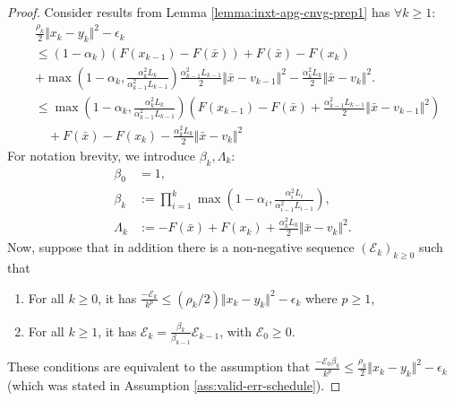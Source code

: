 \documentclass[12pt]{article}
\begin{document}
    \begin{proof}
        Consider results from Lemma \ref{lemma:inxt-apg-cnvg-prep1} has $\forall k \ge 1$: 
        \begin{align*}
            & \frac{\rho_k}{2}\Vert x_k - y_k\Vert^2 - \epsilon_k
            \\
            &\le 
            (1 - \alpha_k)(F(x_{k - 1}) - F(\bar x)) + F(\bar x) - F(x_k) 
            \\ &
            + \max\left(
                    1 - \alpha_k, \frac{\alpha_k^2L_k}{\alpha_{k - 1}^2L_{k - 1}}
                \right)\frac{\alpha_{k - 1}^2L_{k - 1}}{2}\Vert \bar x - v_{k - 1}\Vert^2 
            - \frac{\alpha_k^2L_k}{2}\Vert \bar x - v_k\Vert^2. 
            \\
            &\le \max\left(
                1 - \alpha_k, \frac{\alpha_k^2L_k}{\alpha_{k - 1}^2L_{k - 1}}
            \right)\left(
                F(x_{k - 1}) - F(\bar x)
                + \frac{\alpha_{k - 1}^2L_{k - 1}}{2}\Vert \bar x - v_{k - 1}\Vert^2 
            \right)
            \\&\quad 
                + F(\bar x) - F(x_k) - \frac{\alpha_k^2L_k}{2}\Vert \bar x - v_k\Vert^2
        \end{align*}
        For notation brevity, we introduce $\beta_k, \Lambda_k$: 
        \begin{align*}
            \beta_0 &= 1, 
            \\
            \beta_k &:= \prod_{i = 1}^{k} \max\left(
                1 - \alpha_i, \frac{\alpha_i^2L_i}{\alpha_{i - 1}^2L_{i - 1}}
            \right),
            \\
            \Lambda_k &:= 
            - F(\bar x) + F(x_k) + \frac{\alpha_k^2L_k}{2}\Vert \bar x - v_k\Vert^2. 
        \end{align*}
        Now, suppose that in addition there is a non-negative sequence $(\mathcal  E_k)_{k \ge 0}$ such that 
        \begin{enumerate}[nosep]
            \item For all $k \ge 0$, it has $\frac{-\mathcal E_k}{k^p} \le (\rho_k/2)\Vert x_k - y_k\Vert^2 - \epsilon_k$ where $p \ge 1$, 
            \item For all $k \ge 1$, it has $\mathcal E_k = \frac{\beta_k}{\beta_{k - 1}}\mathcal E_{k - 1}$, with $\mathcal E_0 \ge 0$. 
        \end{enumerate}
        These conditions are equivalent to the assumption that $\frac{- \mathcal E_0\beta_k}{k^p} \le \frac{\rho_k}{2}\Vert x_k - y_k\Vert^2 - \epsilon_k$ (which was stated in Assumption \ref{ass:valid-err-schedule}). 

\end{proof}
\end{document}
